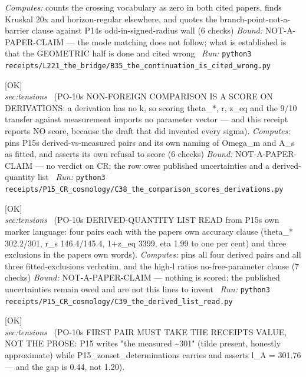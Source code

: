 \begin{description}
\emph{Computes:} counts the crossing vocabulary as zero in both cited papers, finds Kruskal 20x and horizon-regular elsewhere, and quotes the branch-point-not-a-barrier clause against P14s odd-in-signed-radius wall (6 checks)
 \emph{Bound:} NOT-A-PAPER-CLAIM --- the mode matching does not follow; what is established is that the GEOMETRIC half is done and cited wrong
\ \emph{Run:} \texttt{python3 receipts/L221\_the\_bridge/B35\_the\_continuation\_is\_cited\_wrong.py}
\item[\label{rcpt:C38_the_comparison_scores_derivations}\texttt{C38\_the\_comparison\_scores\_derivations}]\hfill\textsf{[OK]}\\
\textit{sec:tensions} \ (PO-10s NON-FOREIGN COMPARISON IS A SCORE ON DERIVATIONS: a derivation has no k, so scoring theta\_*, r, z\_eq and the 9/10 transfer against measurement imports no parameter vector --- and this receipt reports NO score, because the draft that did invented every sigma). 
\emph{Computes:} pins P15s derived-vs-measured pairs and its own naming of Omega\_m and A\_s as fitted, and asserts its own refusal to score (6 checks)
 \emph{Bound:} NOT-A-PAPER-CLAIM --- no verdict on CR; the row owes published uncertainties and a derived-quantity list
\ \emph{Run:} \texttt{python3 receipts/P15\_CR\_cosmology/C38\_the\_comparison\_scores\_derivations.py}
\item[\label{rcpt:C39_the_derived_list_read}\texttt{C39\_the\_derived\_list\_read}]\hfill\textsf{[OK]}\\
\textit{sec:tensions} \ (PO-10s DERIVED-QUANTITY LIST READ from P15s own marker language: four pairs each with the papers own accuracy clause (theta\_* 302.2/301, r\_s 146.4/145.4, 1+z\_eq 3399, eta 1.99 to one per cent) and three exclusions in the papers own words). 
\emph{Computes:} pins all four derived pairs and all three fitted-exclusions verbatim, and the high-l ratios no-free-parameter clause (7 checks)
 \emph{Bound:} NOT-A-PAPER-CLAIM --- nothing is scored; the published uncertainties remain owed and are not this lines to invent
\ \emph{Run:} \texttt{python3 receipts/P15\_CR\_cosmology/C39\_the\_derived\_list\_read.py}
\item[\label{rcpt:C40_the_pair_was_quoted_against_a_rounding}\texttt{C40\_the\_pair\_was\_quoted\_against\_a\_rounding}]\hfill\textsf{[OK]}\\
\textit{sec:tensions} \ (PO-10s FIRST PAIR MUST TAKE THE RECEIPTS VALUE, NOT THE PROSE: P15 writes "the measured \textasciitilde{}301" (tilde present, honestly approximate) while P15\_zonset\_determinations carries and asserts l\_A = 301.76 --- and the gap is 0.44, not 1.20). 

\end{description}
